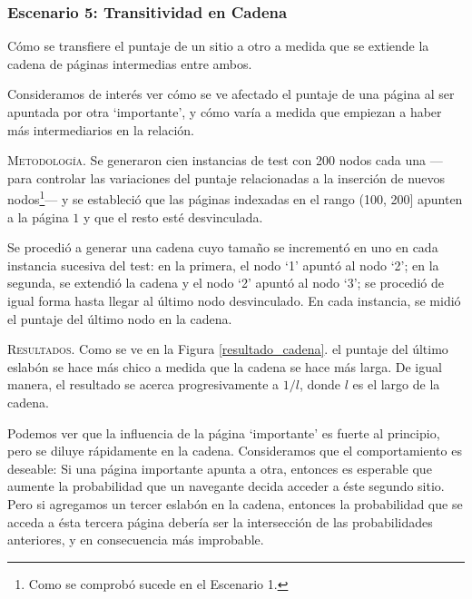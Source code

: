 \vspace{2em}
\subsubsection{Escenario 5: Transitividad en Cadena} Cómo se transfiere el puntaje de un sitio a otro a medida que se extiende la cadena de páginas intermedias entre ambos.

\vspace{1em}

\vspace{1em}
Consideramos de interés ver cómo se ve afectado el puntaje de una página al ser apuntada por otra `importante', y cómo varía a medida que empiezan a haber más intermediarios en la relación. 

\vspace{1em}
\noindent \textsc{Metodología}. Se generaron cien instancias de test con 200 nodos cada una ---para controlar las variaciones del puntaje relacionadas a la inserción de nuevos nodos\footnote{Como se comprobó sucede en el Escenario 1.}--- y se estableció que las páginas indexadas en el rango (100, 200] apunten a la página $1$ y que el resto esté desvinculada. 

\vspace{1em}

\vspace{1em}
Se procedió a generar una cadena cuyo tamaño se incrementó en uno en cada instancia sucesiva del test: en la primera, el nodo `1' apuntó al nodo `2'; en la segunda, se extendió la cadena y el nodo `2' apuntó al nodo `3'; se procedió de igual forma hasta llegar al último nodo desvinculado. En cada instancia, se midió el puntaje del último nodo en la cadena.

\vspace{1em}
\noindent \textsc{Resultados}. Como se ve en la Figura \ref{resultado_cadena}. el puntaje del último eslabón se hace más chico a medida que la cadena se hace más larga. De igual manera, el resultado se acerca progresivamente a $1/l$, donde $l$ es el largo de la cadena. 

\vspace{1em}
Podemos ver que la influencia de la página `importante' es fuerte al principio, pero se diluye rápidamente en la cadena. Consideramos que el comportamiento es deseable: Si una página importante apunta a otra, entonces es esperable que aumente la probabilidad que un navegante decida acceder a éste segundo sitio. Pero si agregamos un tercer eslabón en la cadena, entonces la probabilidad que se acceda a ésta tercera página debería ser la intersección de las probabilidades anteriores, y en consecuencia más improbable. 




